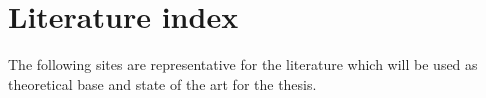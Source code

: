 \section{Literature index}
\label{sec:literature-index}
The following sites are representative for the literature which will be used as theoretical base and state of the art for the thesis.

\cite{PicozziHepburnConnor2017}
\cite{Morris2017}
\cite{Newman2015}
\cite{HohpeWoolf2003}
\cite{DockerDoc}
\cite{MartinFowlerBlog}
\cite{OpenshiftDoc}
\cite{redHatJBossFuse}



